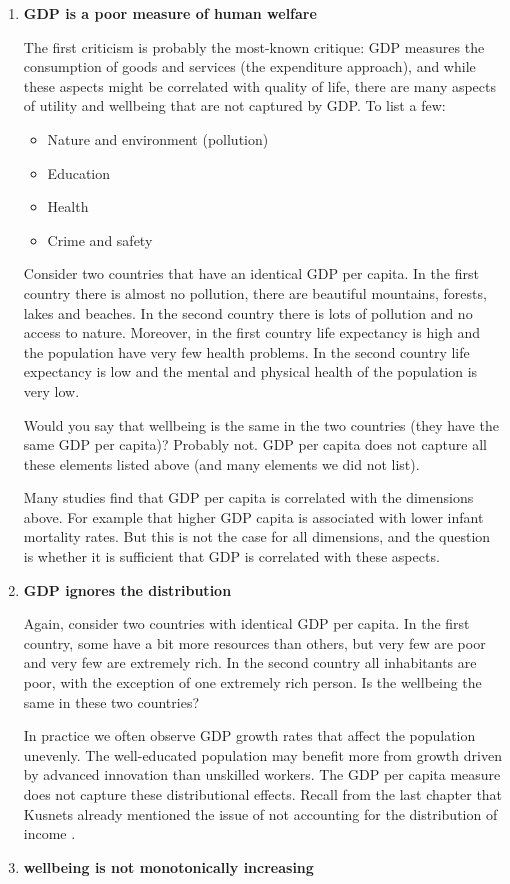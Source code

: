 \documentclass[
]{book}
\providecommand{\tightlist}{%
  \setlength{\itemsep}{0pt}\setlength{\parskip}{0pt}}
\begin{document}
\begin{enumerate}
\def\labelenumi{\arabic{enumi}.}
\item
  \textbf{GDP is a poor measure of human welfare}

  The first criticism is probably the most-known critique: GDP measures the consumption of goods and services (the expenditure approach), and while these aspects might be correlated with quality of life, there are many aspects of utility and wellbeing that are not captured by GDP. To list a few:

  \begin{itemize}
  \tightlist
  \item
    Nature and environment (pollution)
  \item
    Education
  \item
    Health
  \item
    Crime and safety
  \end{itemize}

  Consider two countries that have an identical GDP per capita. In the first country there is almost no pollution, there are beautiful mountains, forests, lakes and beaches. In the second country there is lots of pollution and no access to nature. Moreover, in the first country life expectancy is high and the population have very few health problems. In the second country life expectancy is low and the mental and physical health of the population is very low.

  Would you say that wellbeing is the same in the two countries (they have the same GDP per capita)? Probably not. GDP per capita does not capture all these elements listed above (and many elements we did not list).

  Many studies find that GDP per capita is correlated with the dimensions above. For example that higher GDP capita is associated with lower infant mortality rates. But this is not the case for all dimensions, and the question is whether it is sufficient that GDP is correlated with these aspects.
\item
  \textbf{GDP ignores the distribution}

  Again, consider two countries with identical GDP per capita. In the first country, some have a bit more resources than others, but very few are poor and very few are extremely rich. In the second country all inhabitants are poor, with the exception of one extremely rich person. Is the wellbeing the same in these two countries?

  In practice we often observe GDP growth rates that affect the population unevenly. The well-educated population may benefit more from growth driven by advanced innovation than unskilled workers. The GDP per capita measure does not capture these distributional effects. Recall from the last chapter that Kusnets already mentioned the issue of not accounting for the distribution of income \citep[page 6 in][]{kuznets1934national}.
\item
  \textbf{wellbeing is not monotonically increasing}


\end{enumerate}
\end{document}
